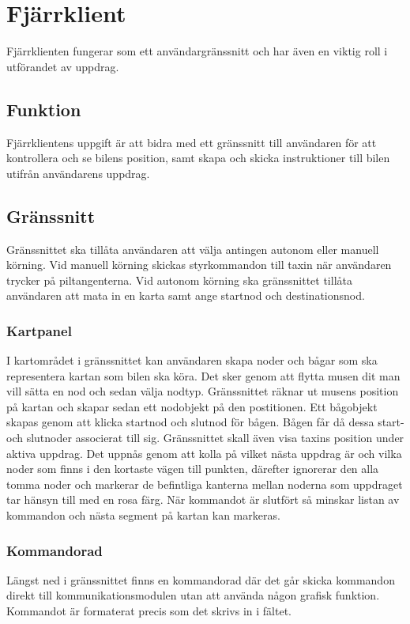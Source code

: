 \documentclass[tekniskrapport/tech.tex]{subfiles}
\begin{document}
\section{Fjärrklient}
Fjärrklienten fungerar som ett användargränssnitt och har även en
viktig roll i utförandet av uppdrag.

\subsection{Funktion}
Fjärrklientens uppgift är att bidra med ett gränssnitt till användaren för att
kontrollera och se bilens position, samt skapa och skicka instruktioner till
bilen utifrån användarens uppdrag.

\subsection{Gränssnitt} Gränssnittet ska tillåta användaren att välja antingen
autonom eller manuell körning. Vid manuell körning skickas styrkommandon till
taxin när användaren trycker på piltangenterna. Vid autonom körning ska
gränssnittet tillåta användaren att mata in en karta samt ange startnod och
destinationsnod. 

\subsubsection{Kartpanel}
I kartområdet i gränssnittet kan användaren skapa noder och bågar som ska
representera kartan som bilen ska köra. Det sker genom att flytta musen dit man
vill sätta en nod och sedan välja nodtyp. Gränssnittet räknar ut musens
position på kartan och skapar sedan ett nodobjekt på den postitionen.  Ett
bågobjekt skapas genom att klicka startnod och slutnod för bågen.  Bågen får då
dessa start- och slutnoder associerat till sig.  Gränssnittet skall även visa
taxins position under aktiva uppdrag. Det uppnås genom att kolla på vilket
nästa uppdrag är och vilka noder som finns i den kortaste vägen till punkten,
därefter ignorerar den alla tomma noder och markerar de befintliga kanterna
mellan noderna som uppdraget tar hänsyn till  med en rosa färg. När kommandot
är slutfört så minskar listan av kommandon och nästa segment på kartan kan
markeras.

\subsubsection{Kommandorad}
Längst ned i gränssnittet finns en kommandorad där det går skicka kommandon
direkt till kommunikationsmodulen utan att använda någon grafisk funktion.
Kommandot är formaterat precis som det skrivs in i fältet.
\end{document}
